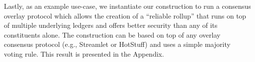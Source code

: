 Lastly, as an example use-case, we instantiate our \rollerblade construction
to run a consensus overlay protocol which allows the creation of a ``reliable
rollup'' that runs on top of multiple underlying ledgers and offers better security
than any of its constituents alone. The construction can be based on top of any
overlay consensus protocol (e.g., Streamlet or HotStuff) and uses a simple
majority voting rule. This result is presented in the Appendix.


%
%
%

